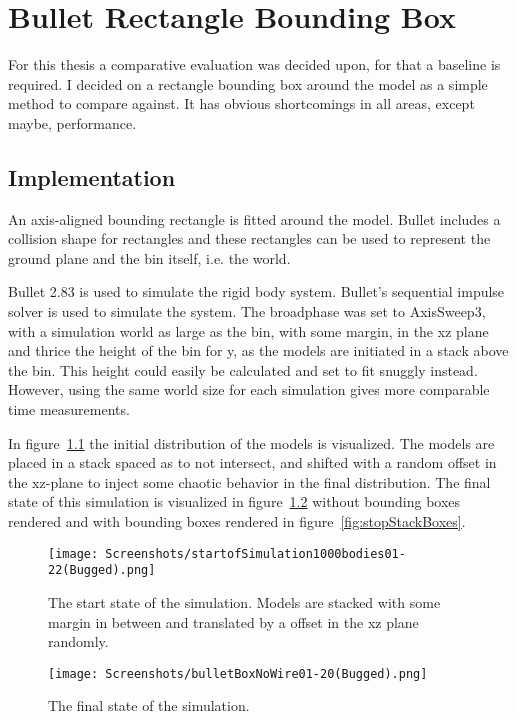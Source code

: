 \chapter{Bullet Rectangle Bounding Box}\label{cha:meth}
For this thesis a comparative evaluation was decided upon, for that a baseline is
required. I decided on a rectangle bounding box around the model
as a simple method to compare against. It has obvious shortcomings in all
areas, except maybe, performance.

\section{Implementation}\label{sec:recImpl}
An axis-aligned bounding rectangle is fitted around the model.
Bullet includes a collision shape for rectangles and these rectangles can be used
to represent the ground plane and the bin itself, i.e. the world.

Bullet 2.83 is used to simulate the rigid body system.
Bullet's sequential impulse solver is used to simulate the system. The broadphase
was set to AxisSweep3, with a simulation world as large as the bin, with some margin, in the
xz plane and thrice the height of the bin for y, as the models are initiated in a stack
above the bin. This height could easily be calculated and set to fit snuggly instead.
However, using the same world size for each simulation gives more comparable time measurements.

In figure~\ref{fig:startStack} the initial distribution of the models is visualized.
The models are placed in a stack spaced as to not intersect, and shifted with a random
offset in the xz-plane to inject some chaotic behavior in the final distribution.
The final state of this simulation is visualized in figure~\ref{fig:stopStack}
without bounding boxes rendered and with bounding boxes rendered in figure~\ref{fig:stopStackBoxes}.

\begin{figure}[H]
  \centering
  \texttt{[image: Screenshots/startofSimulation1000bodies01-22(Bugged).png]}
  \caption{The start state of the simulation. Models are stacked with some margin in between and translated by a offset in the xz plane randomly. }
  \label{fig:startStack}
\end{figure}

\begin{figure}[H]
  \centering
  \texttt{[image: Screenshots/bulletBoxNoWire01-20(Bugged).png]}
  \caption{The final state of the simulation.}
  \label{fig:stopStack}
\end{figure}

